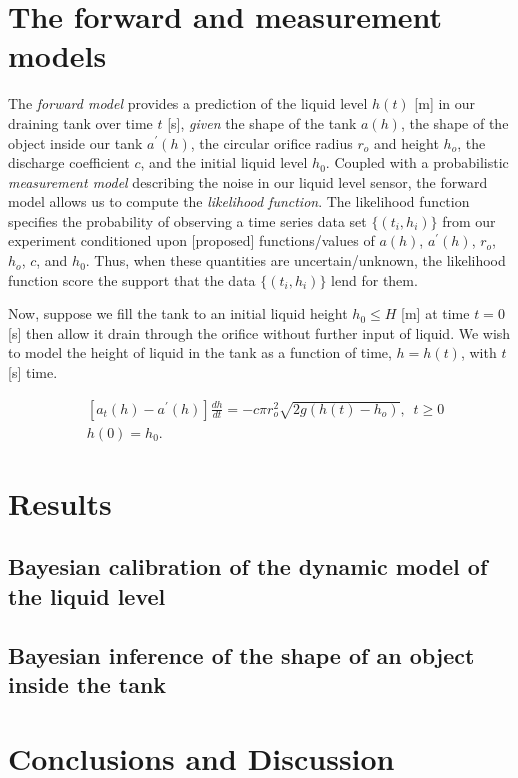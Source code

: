 \documentclass[openacc]{rsproca_new}%
\begin{document}
\section{The forward and measurement models}
The \emph{forward model} provides a prediction of the liquid level $h(t)$ [m] in our draining tank over time $t$ [s], \emph{given} the shape of the tank $a(h)$, the shape of the object inside our tank $a^\prime(h)$, the circular orifice radius $r_o$ and height $h_o$, the discharge coefficient $c$, and the initial liquid level $h_0$. 
Coupled with a probabilistic \emph{measurement model} describing the noise in our liquid level sensor, the forward model allows us to compute the \emph{likelihood function}. The likelihood function specifies the probability of observing a time series data set $\{(t_i, h_i)\}$ from our experiment conditioned upon [proposed] functions/values of $a(h)$, $a^\prime(h)$, $r_o$, $h_o$, $c$, and $h_0$. Thus, when these quantities are uncertain/unknown, the likelihood function score the support that the data $\{(t_i, h_i)\}$ lend for them.

Now, suppose we fill the tank to an initial liquid height $h_0 \leq H$ [m] at time $t=0$ [s] then allow it drain through the orifice without further input of liquid. We wish to model the height of liquid in the tank as a function of time, $h=h(t)$, with $t$ [s] time. 

\begin{align}
& [a_t(h)-a^\prime(h)]\frac{dh}{dt}= -c \pi r_o^2 \sqrt{2g (h(t)-h_o)}, \,\,\, t \geq 0 \\
& h(0)=h_0.
\end{align}

\section{Results}
\subsection{Bayesian calibration of the dynamic model of the liquid level}

\subsection{Bayesian inference of the shape of an object inside the tank}

\section{Conclusions and Discussion}
\end{document}
